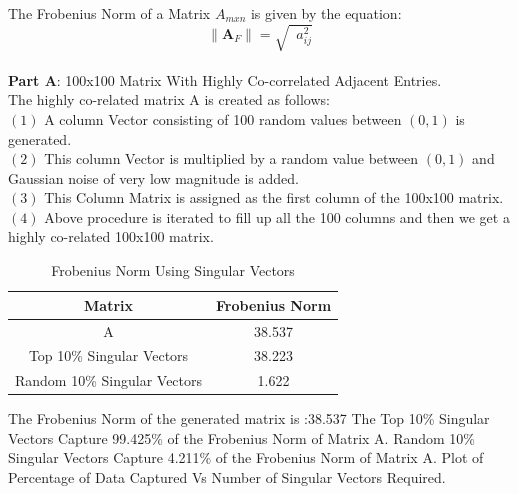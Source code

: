 \documentclass[a4 paper]{article}
\begin{document}
\clearpage
{}
The Frobenius Norm of a Matrix  $A_{mxn}$  is given by the equation:\\
\begin{equation}
    \|\mathbf{A} _{F}\| = \sqrt{\mathop{\sum_{i=i}^{m}\sum_{j=1}^{n}}{a_{ij}^{2}}}
\end{equation}\\
\bigskip
\textbf{Part A}: 100x100 Matrix With Highly Co-correlated Adjacent Entries.\\
The highly co-related matrix A is created as follows:\\
$(1)$ A column Vector consisting of 100 random values between $(0,1)$ is generated.\\
$(2)$ This column Vector is multiplied by a random value between $(0,1)$ and Gaussian noise of very low magnitude is added.\\
$(3)$ This Column Matrix is assigned as the first column of the 100x100 matrix.\\
$(4)$ Above procedure is iterated to fill up all the 100 columns and then we get a highly co-related 100x100 matrix.\\
\begin{table}[h!]
\centering
 \begin{tabular}{|c|c|} 
 \hline
 Matrix  & Frobenius Norm \\ [0.5ex] 
\hline
A                             &  38.537\\
Top 10\% Singular Vectors     &  38.223\\
Random 10\% Singular Vectors  &  1.622\\
\hline
\end{tabular}
\caption{Frobenius Norm Using Singular Vectors}
\end{table}
 The Frobenius Norm of the generated matrix is :38.537
 The Top 10\% Singular Vectors Capture 99.425\% of the Frobenius Norm of Matrix  A.
 Random 10\% Singular Vectors Capture 4.211\% of the Frobenius Norm of Matrix A.
 Plot of Percentage of Data Captured Vs Number of Singular Vectors Required.\\
\end{document}
